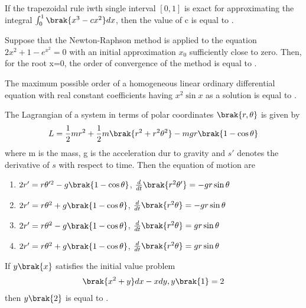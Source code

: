 \vspace{0.5cm}
\item If the trapezoidal rule iwth single interval $[0,1]$ is exact for approximating the integral $\int_0^{1}\brak{x^3-cx^2}dx$, then the value of c is equal to \underline{\hspace{2cm}}.
\vspace{0.5cm}
\item Suppose that the Newton-Raphson method is applied to the equation $2x^2+1-e^{x^2}=0$ with an initial approximation $x_0$ sufficiently close to zero. Then, for the root x=0, the order of convergence of the method is equal to \underline{\hspace{2cm}}.

\vspace{0.5cm}
\item The maximum possible order of a homogeneous linear ordinary differential equation with real constant coefficients having $x^2\sin{x}$ as a solution is equal to \underline{\hspace{2cm}}.

\vspace{0.5cm}
\item The Lagrangian of a system in terms of polar coordinates $\brak{r,\theta}$ is given by
\begin{align*}
   L=\frac{1}{2}mr^2+\frac{1}{2}m\brak{r^2+r^2\theta^2}-mgr\brak{1-\cos{\theta}}
\end{align*}
where m is the mass, g is the acceleration dur to gravity and $s'$ denotes the derivative of $s$ with respect to time. Then the equation of motion are
\begin{enumerate}
    \item $2r'=r\theta'^2-g\brak{1-\cos{\theta}}$, $\frac{d}{dt}\brak{r^2\theta'}=-gr\sin{\theta}$
    \item  $2r'=r\theta^2+g\brak{1-\cos{\theta}}$, $\frac{d}{dt}\brak{r^2\theta}=-gr\sin{\theta}$
    \item  $2r'=r\theta^2-g\brak{1-\cos{\theta}}$, $\frac{d}{dt}\brak{r^2\theta}=gr\sin{\theta}$
    \item  $2r'=r\theta^2+g\brak{1-\cos{\theta}}$, $\frac{d}{dt}\brak{r^2\theta}=gr\sin{\theta}$
\end{enumerate}
\vspace{0.5cm}
\item If $y\brak{x}$ satisfies the initial value problem 
\begin{align*}
    \brak{x^2+y}dx-xdy, y\brak{1}=2
\end{align*}
then $y\brak{2}$ is equal to \underline{\hspace{2cm}}.
\vspace{0.5cm}

